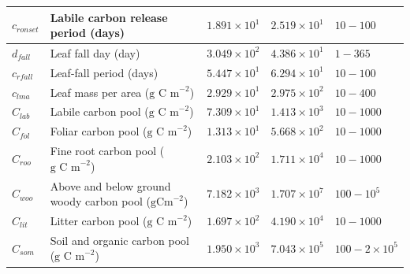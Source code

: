 \documentclass[draft,linenumbers]{agujournal}
\begin{document}
\begin{table}[ht]
\begin{center}
\begin{tabular}{| l | p{4.5cm} | p{1.7cm} | p{1.7cm} | p{1.7cm} |}
$c_{ronset}$ & Labile carbon release period (days) & $1.891\times 10^{1}$ & $2.519\times 10^{1}$ & $10 - 100$ \\ \hline
$d_{fall}$ & Leaf fall day (day) & $3.049\times 10^{2}$ & $4.386\times 10^{1}$ & $1 - 365$ \\ \hline
$c_{rfall}$ & Leaf-fall period (days) & $5.447\times 10^{1}$ & $6.294\times 10^{1}$ & $10 - 100$ \\ \hline
$c_{lma}$ & Leaf mass per area ($\text{g C m}^{-2}$) & $2.929\times 10^{1}$ & $2.975\times 10^{2}$ & $10 - 400$ \\ \hline
$C_{lab}$ & Labile carbon pool ($\text{g C m}^{-2}$) & $7.309\times 10^{1}$ & $1.413\times 10^{3}$ & $10 - 1000$ \\ \hline
$C_{fol}$ & Foliar carbon pool ($\text{g C m}^{-2}$) & $1.313\times 10^{1}$ & $5.668\times 10^{2}$ & $10 - 1000$ \\ \hline
$C_{roo}$ & Fine root carbon pool ($\text{g C m}^{-2}$) & $2.103\times 10^{2}$ & $1.711\times 10^{4}$ & $10 - 1000$ \\ \hline
$C_{woo}$ & Above and below ground woody carbon pool ($\text{gCm}^{-2}$) & $7.182\times 10^{3}$ & $1.707\times 10^{7}$ & $100 - 10^{5}$ \\ \hline
$C_{lit}$ & Litter carbon pool ($\text{g C m}^{-2}$) & $1.697\times 10^{2}$ & $4.190\times 10^{4}$ & $10 - 1000$ \\ \hline
$C_{som}$ & Soil and organic carbon pool ($\text{g C m}^{-2}$) & $1.950\times 10^{3}$ & $7.043\times 10^{5}$ & $100 - 2 \times 10^{5}$  \\ \hline
	\end{tabular}
	\label{table:xbvars}
\end{center} 
\end{table}

\end{document}
